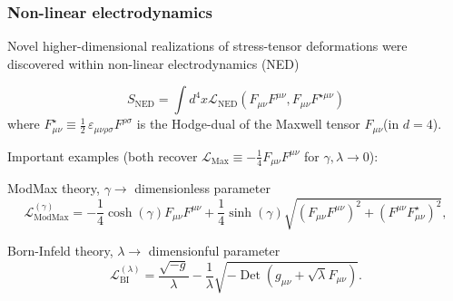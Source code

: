 \documentclass{beamer}
\DeclareMathOperator{\Det}{Det}
\begin{document}
\begin{frame}
\frametitle{Non-linear electrodynamics}

    Novel higher-dimensional realizations of stress-tensor deformations were discovered within non-linear electrodynamics (NED)

    
    \[\boxed{S_{\text{NED}}=\int d^4x\mathcal{L}_{\text{NED}}(F_{\mu\nu}F^{\mu\nu},F_{\mu\nu}F^{\star\mu\nu})}\]
    {\footnotesize where $F^{\star}_{\mu\nu}\equiv \frac{1}{2}\,\varepsilon_{\mu\nu\rho\sigma}F^{\rho\sigma}$ is the Hodge-dual of the Maxwell tensor $F_{\mu\nu}$(in $d=4$).}

    \vspace{0.3cm}

    Important examples (both recover $\mathcal{L}_{\text{Max}}\equiv-\frac{1}{4}F_{\mu\nu}F^{\mu\nu}$ for $\gamma,\lambda\rightarrow0$):

    \begin{exampleblock}{ModMax theory, $\gamma\rightarrow$ dimensionless parameter}
    \[\mathcal{L}_{\text{ModMax}}^{(\gamma)}=-\frac{1}{4}\cosh(\gamma)F_{\mu\nu}F^{\mu\nu}
        +\frac{1}{4}\sinh(\gamma)\sqrt{(F_{\mu\nu}F^{\mu\nu})^2+(F^{\mu\nu}F^{\star}_{\mu\nu})^2},\]
    \end{exampleblock}

    \begin{exampleblock}{Born-Infeld theory, $\lambda\rightarrow$ dimensionful parameter}
    \[
    \mathcal{L}_{\text{BI}}^{(\lambda)}=\frac{\sqrt{-g}}{\lambda}-\frac{1}{\lambda}\sqrt{-\Det(g_{\mu\nu}+\sqrt{\lambda}F_{\mu\nu})}.
    \] 
    \end{exampleblock}




\end{frame}
\end{document}

